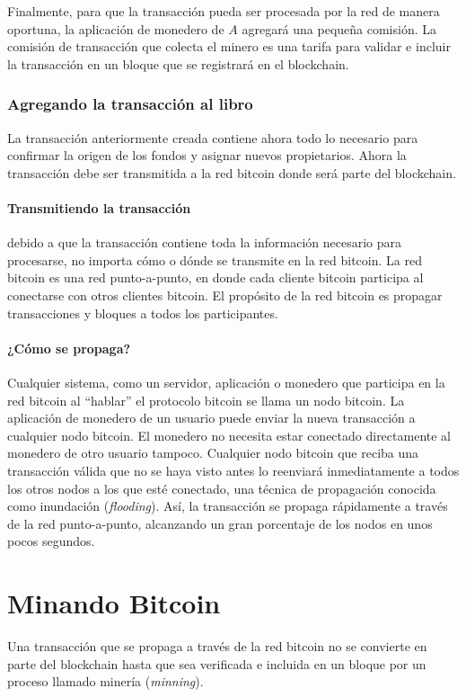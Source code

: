 \documentclass[10pt,journal,compsoc]{IEEEtran}
\begin{document}
Finalmente, para que la transacción pueda ser procesada por la red de manera oportuna, la aplicación de monedero de $A$ agregará una pequeña comisión. La comisión de transacción que colecta el minero es una tarifa para validar e incluir la transacción en un bloque que se registrará en el blockchain.

\subsubsection{Agregando la transacción al libro}
La transacción anteriormente creada contiene ahora todo lo necesario para confirmar la origen de los fondos y asignar nuevos propietarios. Ahora la transacción debe ser transmitida a la red bitcoin donde será parte del blockchain. 

\paragraph{Transmitiendo la transacción} debido a que la transacción contiene toda la información necesario para procesarse, no importa cómo o dónde se transmite en la red bitcoin. La red bitcoin es una red punto-a-punto, en donde cada cliente bitcoin participa al conectarse con otros clientes bitcoin. El propósito de la red bitcoin es propagar transacciones y bloques a todos los participantes.

\paragraph{¿Cómo se propaga?} Cualquier sistema, como un servidor, aplicación o monedero que participa en la red bitcoin al ``hablar'' el protocolo bitcoin se llama un nodo bitcoin. La aplicación de monedero de un usuario puede enviar la nueva transacción a cualquier nodo bitcoin. El monedero no necesita estar conectado directamente al monedero de otro usuario tampoco. Cualquier nodo bitcoin que reciba una transacción válida que no se haya visto antes lo reenviará inmediatamente a todos los otros nodos a los que esté conectado, una técnica de propagación conocida como inundación (\emph{flooding}). Así, la transacción se propaga rápidamente a través de la red punto-a-punto, alcanzando un gran porcentaje de los nodos en unos pocos segundos.

\section{Minando Bitcoin}
Una transacción que se propaga a través de la red bitcoin no se convierte en parte del blockchain hasta que sea verificada e incluida en un bloque por un proceso llamado minería (\emph{minning}).
\end{document}

